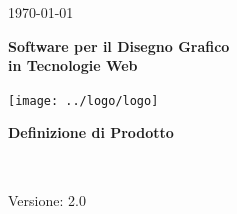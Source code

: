 \usepackage{multirow}

\title{\TITOLODOC}
\author{Stefano Dissegna}



\renewcommand{\insertversion}{2.0} %
\renewcommand{\TITOLODOC}{Definizione di Prodotto} %
\renewcommand{\glosspath}{.\glossario} %

\begin{titlepage}
\begin{center}
	\begin{Large}	\today \end{Large}
\end{center}

\vspace{20pt}

\begin{center}
	\begin{Huge}
				\textbf{\ajax}
	\end{Huge}
\end{center}			

\begin{center}
	\begin{large}
				\textbf{Software per il Disegno Grafico\\ in Tecnologie Web}
	\end{large}
\end{center}			

\vspace{20pt}

\begin{center}
\texttt{[image: ../logo/logo]}
\end{center}

\vspace{170pt}
\begin{center} %
	\begin{Huge}
				\textbf{\TITOLODOC}
	\end{Huge}
			\\
\end{center}
\vspace{190pt}
\begin{center}
Versione: \insertversion
\end{center}
\end{titlepage}

